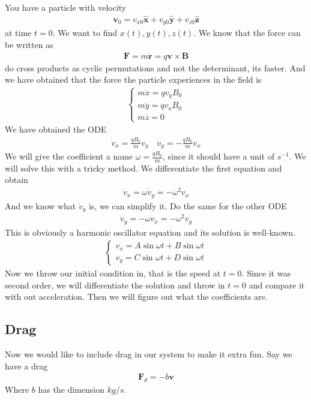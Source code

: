 \documentclass[12pt]{article}
\newcommand{\unx}{\hat{\mathbf{x}}}
\newcommand{\uny}{\hat{\mathbf{y}}}
\newcommand{\unz}{\hat{\mathbf{z}}}
\begin{document}
    You have a particle with velocity 
    \begin{align}
    \mathbf{v}_0  = v_{x0}\unx +v_{y0}\uny + v_{z0}\unz 
\end{align} 
at time $t=0$. We want to find $x(t),y(t),z(t)$. We know that the force can be written as
\begin{align}
\mathbf{F} = m\ddot{\mathbf{r}} = q\mathbf{v}\times \mathbf{B}
\end{align}
do cross products as cyclic permutations and not the determinant, its faster. And we have obtained that the force the particle experiences in the field is
\begin{align}
\begin{cases}
    m\ddot{x} = qv_yB_0\\
    m\ddot{y} = qv_xB_0\\
    m\ddot{z} = 0
\end{cases}
\end{align}
We have obtained the ODE
\begin{align}
\dot{v}_x = \frac{qB_0}{m}v_y \quad \dot{v}_y = -\frac{qB_0}{m} v_x
\end{align}
We will give the coefficient a name $\omega = \frac{qB_0}{m}$, since it should have a unit of $s^{-1}$. We will solve this with a tricky method. We differentiate the first equation and obtain
\begin{align}
\ddot{v}_x = \omega\dot{v}_y = -\omega^2v_x
\end{align}
And we know what $\dot{v}_y$ is, we can simplify it. Do the same for the other ODE
\begin{align}
\ddot{v}_y = -\omega v_x = -\omega^2v_y
\end{align}
This is obviously a harmonic oscillator equation and its solution is well-known. 
\begin{align}
\begin{cases}
    v_x = A\sin\omega t + B\sin\omega t\\
    v_y = C\sin\omega t + D\sin\omega t
\end{cases}
\end{align}
Now we throw our initial condition in, that is the speed at $t=0$. Since it was second order, we will differentiate the solution and throw in $t=0$ and compare it with out acceleration. Then we will figure out what the coefficients are. 

\subsection{Drag}
Now we would like to include drag in our system to make it extra fun. Say we have a drag
\begin{align}
\mathbf{F}_d = -b\mathbf{v}
\end{align}
Where $b$ has the dimension $kg/s$. 
\end{document}
